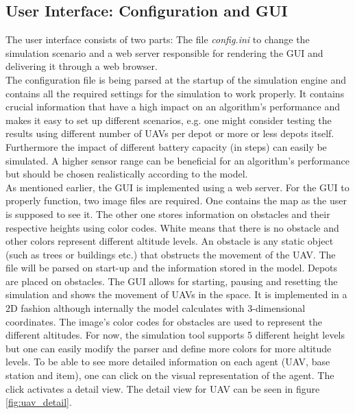 \subsection{User Interface: Configuration and GUI}
The user interface consists of two parts: The file \textit{config.ini} to change the simulation scenario and a web server responsible for rendering the GUI and delivering it through a web browser.\\
The configuration file is being parsed at the startup of the simulation engine and contains all the required settings for the simulation to work properly. It contains crucial information that have a high impact on an algorithm's performance and makes it easy to set up different scenarios, e.g. one might consider testing the results using different number of UAVs per depot or more or less depots itself.
Furthermore the impact of different battery capacity (in steps) can easily be simulated. A higher sensor range can be beneficial for an algorithm's performance but should be chosen realistically according to the model.\\
As mentioned earlier, the GUI is implemented using a web server. For the GUI to properly function, two image files are required. One contains the map as the user is supposed to see it. The other one stores information on obstacles and their respective heights using color codes. White means that there is no obstacle and other colors represent different altitude levels. An obstacle is any static object (such as trees or buildings etc.) that obstructs the movement of the UAV. The file will be parsed on start-up and the information stored in the model.  Depots are placed on obstacles. %
The GUI allows for starting, pausing and resetting the simulation and shows the movement of UAVs in the space. It is implemented in a 2D fashion although internally the model calculates with 3-dimensional coordinates. The image's color codes for obstacles are used to represent the different altitudes. For now, the simulation tool supports 5 different height levels but one can easily modify the parser and define more colors for more altitude levels.
To be able to see more detailed information on each agent (UAV, base station and item), one can click on the visual representation of the agent. The click activates a detail view. The detail view for UAV can be seen in figure \ref{fig:uav_detail}.


